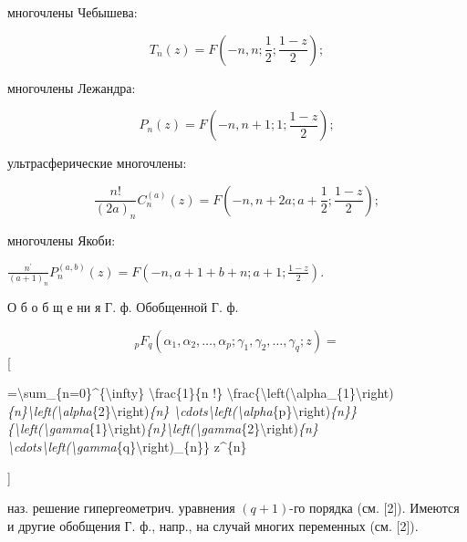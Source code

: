 \documentclass[10pt]{article}
\begin{document}
многочлены Чебышева:



\[

T_{n}(z)=F\left(-n, n ; \frac{1}{2} ; \frac{1-z}{2}\right) ;

\]



многочлены Лежандра:



\[

P_{n}(z)=F\left(-n, n+1 ; 1 ; \frac{1-z}{2}\right) ;

\]



ультрасферические многочлены:



\[

\frac{n !}{(2 a)_{n}} C_{n}^{(a)}(z)=F\left(-n, n+2 a ; a+\frac{1}{2} ; \frac{1-z}{2}\right) ;

\]



многочлены Якоби:



$\frac{n^{\prime}}{(a+1)_{n}} P_{n}^{(a, b)}(z)=F\left(-n, a+1+b+n ; a+1 ; \frac{1-z}{2}\right)$.



О б о б щ е ни я $Г$. ф. Обобщенной $Г$. ф.



\[

{ }_{p} F_{q}\left(\alpha_{1}, \alpha_{2}, \ldots, \alpha_{p} ; \gamma_{1}, \gamma_{2}, \ldots, \gamma_{q} ; z\right)=

\][



=\textbackslash sum\_\{n=0\}\^{}\{\textbackslash infty\} \textbackslash frac\{1\}\{n !\} \textbackslash frac\{\textbackslash left(\textbackslash alpha\_\{1\}\textbackslash right)\textit{\{n\}\textbackslash left(\textbackslash alpha}\{2\}\textbackslash right)\textit{\{n\} \textbackslash cdots\textbackslash left(\textbackslash alpha}\{p\}\textbackslash right)\textit{\{n\}\}\{\textbackslash left(\textbackslash gamma}\{1\}\textbackslash right)\textit{\{n\}\textbackslash left(\textbackslash gamma}\{2\}\textbackslash right)\textit{\{n\} \textbackslash cdots\textbackslash left(\textbackslash gamma}\{q\}\textbackslash right)\_\{n\}\} z\^{}\{n\}

]



наз. решение гипергеометрич. уравнения $(q+1)$-го порядка (см. [2]). Имеются и другие обобщения Г. ф., напр., на случай многих переменных (см. [2]).
\end{document}
